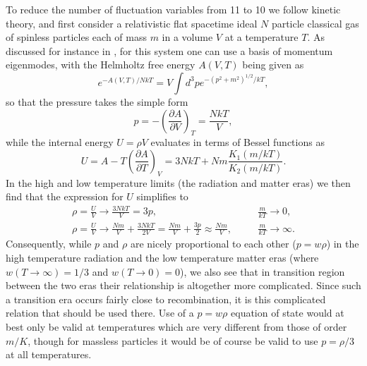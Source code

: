 \documentclass[aps,onecolumn,10pt]{revtex4}
\numberwithin{equation}{section}
\numberwithin{equation}{section}
\begin{document}
To reduce the number of fluctuation variables from 11 to 10 we follow kinetic theory, and first consider a relativistic flat spacetime ideal $N$ particle classical gas of spinless particles each of mass $m$ in a volume $V$ at a temperature $T$. As discussed for instance in \cite{Mannheim2006}, for this
system one can use a basis of momentum eigenmodes, with the Helmholtz free energy $A(V,T)$ being given as 
%                                                                               
\begin{equation}
e^{-A(V,T)/NkT}=V\int
d^3pe^{-(p^2+m^2)^{1/2}/kT}, 
\label{9.50}
\end{equation}                                 
%  
so that the pressure takes the simple form 
%                                                                               
\begin{equation}
p=-\left(\frac{\partial A}{ \partial
V}\right)_T=\frac{NkT}{V},
\label{9.51}
\end{equation}                                 
% 
while the internal energy $U=\rho V$ evaluates in terms of Bessel
functions as  
%                                                                               
\begin{equation}
U=A-T\left(\frac{\partial A}{ \partial
T}\right)_V=3NkT+Nm\frac{K_1(m/kT)}{K_2(m/kT)}.
\label{9.52}
\end{equation}                                 
% 
In the high and low temperature limits (the radiation and matter eras)
we then find that the expression for $U$ simplifies to
%                                                                               
\begin{eqnarray}
\rho=\frac{U}{V}\rightarrow
\frac{3NkT}{V}=3p,&&\quad \frac{m}{kT}\rightarrow 0,
\nonumber \\
\rho=\frac{U}{V} \rightarrow
\frac{Nm}{V}+\frac{3NkT}{2V}=\frac{Nm}{V}+\frac{3p}{2} \approx
\frac{Nm}{V},&&\quad \frac{m}{kT}
\rightarrow \infty.
\label{9.53}
\end{eqnarray}                                 
% 
Consequently, while $p$ and $\rho$ are nicely proportional to each other ($p=w\rho$)
in the high temperature radiation and the low temperature matter eras
(where $w(T\rightarrow\infty)=1/3$ and $w(T\rightarrow 0)=0$), we also
see that in transition region between the two eras their relationship is
altogether more complicated. Since such a transition era occurs fairly close to recombination, it is this complicated relation that should be used there. Use of a $p=w\rho$ equation of state would at best only be valid at temperatures which are very different from
those of order $m/K$, though for massless particles it would be of
course be valid to use $p=\rho/3$ at all temperatures. 
\end{document}
